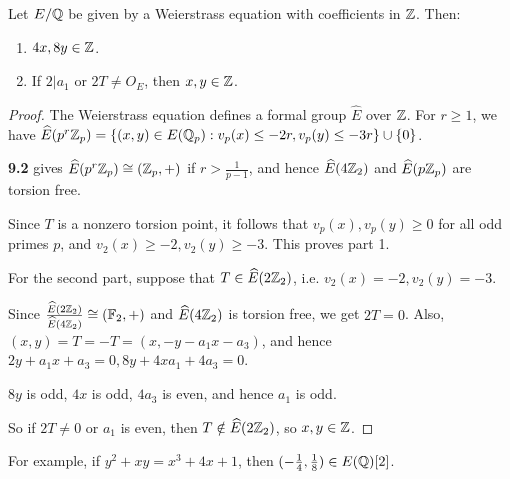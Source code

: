 \documentclass[10pt,a4paper]{article}
\begin{document}
\begin{lemma}
  Let $E/\mathbb{Q}$ be given by a Weierstrass equation with coefficients in $\mathbb{Z}$. Then:
  \begin{enumerate}
    \item $4x, 8y \in \mathbb{Z}$.
    \item If $2|a_1$ or $2T \neq O_E$, then $x, y \in \mathbb{Z}$.
  \end{enumerate}
\end{lemma}
\begin{proof}
  The Weierstrass equation defines a formal group $\hat{E}$ over $\mathbb{Z}$. For $r\geq 1$, we have $\widehat{E}(p^r\mathbb{Z}_p) = \{(x,y) \in E(\mathbb{Q}_p) : v_p(x)\leq -2r, v_p(y)\leq -3r\}\cup \{0\}$.

  \textbf{9.2} gives $\widehat{E}(p^r\mathbb{Z}_p) \cong (\mathbb{Z}_p, +)$ if $r >\frac{1}{p-1}$, and hence $\widehat{E}(4\mathbb{Z}_2)$ and $\widehat{E}(p\mathbb{Z}_p)$ are torsion free.

  Since $T$ is a nonzero torsion point, it follows that $v_p(x), v_p(y) \geq 0$ for all odd primes $p$, and $v_2(x) \geq -2, v_2(y) \geq -3$. This proves part 1.

  For the second part, suppose that $T \in \widehat{E}(2\mathbb{Z}_2)$, i.e. $v_2(x) = -2, v_2(y)=-3$.

  Since $\frac{\widehat{E}(2\mathbb{Z}_2)}{\widehat{E}(4\mathbb{Z}_2)} \cong (\mathbb{F}_2, +)$ and $\widehat{E}(4\mathbb{Z}_2)$ is torsion free, we get $2T = 0$. Also, $(x, y) = T = -T = (x, -y-a_1x-a_3)$, and hence $2y+a_1x+a_3 = 0, 8y+4xa_1+4a_3 = 0$.

  $8y$ is odd, $4x$ is odd, $4a_3$ is even, and hence $a_1$ is odd.

  So if $2T \neq 0$ or $a_1$ is even, then $T \notin \widehat{E}(2\mathbb{Z}_2)$, so $x, y \in \mathbb{Z}$.
\end{proof}
For example, if $y^2+xy = x^3+4x+1$, then $(-\frac14, \frac18) \in E(\mathbb{Q})[2]$.
\end{document}
